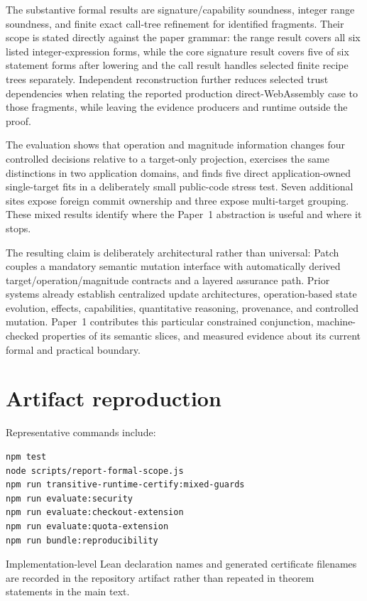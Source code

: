 \documentclass[10pt]{article}
\theoremstyle{plain}
\theoremstyle{remark}
\begin{document}
The substantive formal results are signature/capability soundness, integer range soundness, and finite exact call-tree refinement for identified fragments. Their scope is stated directly against the paper grammar: the range result covers all six listed integer-expression forms, while the core signature result covers five of six statement forms after lowering and the call result handles selected finite recipe trees separately. Independent reconstruction further reduces selected trust dependencies when relating the reported production direct-WebAssembly case to those fragments, while leaving the evidence producers and runtime outside the proof.

The evaluation shows that operation and magnitude information changes four controlled decisions relative to a target-only projection, exercises the same distinctions in two application domains, and finds five direct application-owned single-target fits in a deliberately small public-code stress test. Seven additional sites expose foreign commit ownership and three expose multi-target grouping. These mixed results identify where the Paper~1 abstraction is useful and where it stops.

The resulting claim is deliberately architectural rather than universal: Patch couples a mandatory semantic mutation interface with automatically derived target/operation/magnitude contracts and a layered assurance path. Prior systems already establish centralized update architectures, operation-based state evolution, effects, capabilities, quantitative reasoning, provenance, and controlled mutation. Paper~1 contributes this particular constrained conjunction, machine-checked properties of its semantic slices, and measured evidence about its current formal and practical boundary.

\appendix
\section{Artifact reproduction}
\label{app:repro}
Representative commands include:
\begin{verbatim}
npm test
node scripts/report-formal-scope.js
npm run transitive-runtime-certify:mixed-guards
npm run evaluate:security
npm run evaluate:checkout-extension
npm run evaluate:quota-extension
npm run bundle:reproducibility
\end{verbatim}

Implementation-level Lean declaration names and generated certificate filenames are recorded in the repository artifact rather than repeated in theorem statements in the main text.



\end{document}
